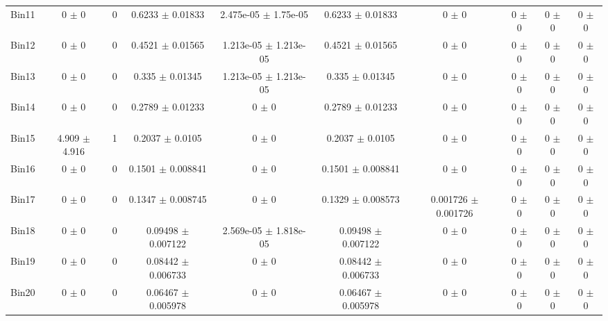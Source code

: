 \begin{tabular}{@{\extracolsep{4pt}}lccccccccc@{}}
     Bin11 & 0 $\pm$ 0 & 0 & 0.6233 $\pm$ 0.01833 & 2.475e-05 $\pm$ 1.75e-05 & 0.6233 $\pm$ 0.01833 & 0 $\pm$ 0 & 0 $\pm$ 0 & 0 $\pm$ 0 & 0 $\pm$ 0 \\ 
     Bin12 & 0 $\pm$ 0 & 0 & 0.4521 $\pm$ 0.01565 & 1.213e-05 $\pm$ 1.213e-05 & 0.4521 $\pm$ 0.01565 & 0 $\pm$ 0 & 0 $\pm$ 0 & 0 $\pm$ 0 & 0 $\pm$ 0 \\ 
     Bin13 & 0 $\pm$ 0 & 0 & 0.335 $\pm$ 0.01345 & 1.213e-05 $\pm$ 1.213e-05 & 0.335 $\pm$ 0.01345 & 0 $\pm$ 0 & 0 $\pm$ 0 & 0 $\pm$ 0 & 0 $\pm$ 0 \\ 
     Bin14 & 0 $\pm$ 0 & 0 & 0.2789 $\pm$ 0.01233 & 0 $\pm$ 0 & 0.2789 $\pm$ 0.01233 & 0 $\pm$ 0 & 0 $\pm$ 0 & 0 $\pm$ 0 & 0 $\pm$ 0 \\ 
     Bin15 & 4.909 $\pm$ 4.916 & 1 & 0.2037 $\pm$ 0.0105 & 0 $\pm$ 0 & 0.2037 $\pm$ 0.0105 & 0 $\pm$ 0 & 0 $\pm$ 0 & 0 $\pm$ 0 & 0 $\pm$ 0 \\ 
     Bin16 & 0 $\pm$ 0 & 0 & 0.1501 $\pm$ 0.008841 & 0 $\pm$ 0 & 0.1501 $\pm$ 0.008841 & 0 $\pm$ 0 & 0 $\pm$ 0 & 0 $\pm$ 0 & 0 $\pm$ 0 \\ 
     Bin17 & 0 $\pm$ 0 & 0 & 0.1347 $\pm$ 0.008745 & 0 $\pm$ 0 & 0.1329 $\pm$ 0.008573 & 0.001726 $\pm$ 0.001726 & 0 $\pm$ 0 & 0 $\pm$ 0 & 0 $\pm$ 0 \\ 
     Bin18 & 0 $\pm$ 0 & 0 & 0.09498 $\pm$ 0.007122 & 2.569e-05 $\pm$ 1.818e-05 & 0.09498 $\pm$ 0.007122 & 0 $\pm$ 0 & 0 $\pm$ 0 & 0 $\pm$ 0 & 0 $\pm$ 0 \\ 
     Bin19 & 0 $\pm$ 0 & 0 & 0.08442 $\pm$ 0.006733 & 0 $\pm$ 0 & 0.08442 $\pm$ 0.006733 & 0 $\pm$ 0 & 0 $\pm$ 0 & 0 $\pm$ 0 & 0 $\pm$ 0 \\ 
     Bin20 & 0 $\pm$ 0 & 0 & 0.06467 $\pm$ 0.005978 & 0 $\pm$ 0 & 0.06467 $\pm$ 0.005978 & 0 $\pm$ 0 & 0 $\pm$ 0 & 0 $\pm$ 0 & 0 $\pm$ 0 \\ 
\hline\hline
  \end{tabular}
